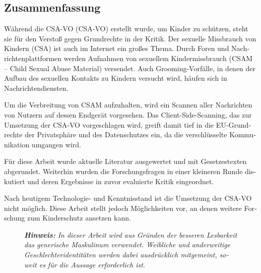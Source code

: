 \begin{otherlanguage}{ngerman}
	\chapter*{Zusammenfassung}
    
Während die \acl{CSA-VO} (\acs{CSA-VO}) erstellt wurde, um Kinder zu schützen, steht sie für den Verstoß gegen Grundrechte in der Kritik. Der sexuelle Missbrauch von Kindern (\acf{CSA}) ist auch im Internet ein großes Thema. Durch Foren und Nachrichtenplattformen werden Aufnahmen von sexuellem Kindermissbrauch (\acs{CSAM} – Child Sexual Abuse Material) versendet. Auch Grooming-Vorfälle, in denen der Aufbau des sexuellen Kontakts zu Kindern versucht wird, häufen sich in Nachrichtendiensten.

Um die Verbreitung von \acs{CSAM} aufzuhalten, wird ein Scannen aller Nachrichten von Nutzern auf dessen Endgerät vorgesehen. Das Client-Side-Scan\-ning, das zur Umsetzung der \acs{CSA-VO} vorgeschlagen wird, greift damit tief in die \acs{EU}-Grundrechte der Privatsphäre und des Datenschutzes ein, da die verschlüsselte Kommunikation umgangen wird.


Für diese Arbeit wurde aktuelle Literatur ausgewertet und mit Gesetzestexten abgerundet. Weiterhin wurden die Forschungsfragen in einer kleineren Runde diskutiert und deren Ergebnisse in zuvor evaluierte Kritik eingeordnet.

Nach heutigem Technologie- und Kenntnisstand ist die Umsetzung der \acs{CSA-VO} nicht möglich. Diese Arbeit stellt jedoch Möglichkeiten vor, an denen weitere Forschung zum Kinderschutz ansetzen kann.

\begin{figure}[b]
    \noindent
    \textit{\textbf{Hinweis:} In dieser Arbeit wird aus Gründen der besseren Lesbarkeit das generische Maskulinum verwendet. Weibliche und anderweitige Geschlechteridentitäten werden dabei ausdrücklich mitgemeint, soweit es für die Aussage erforderlich ist.}
\end{figure}



\end{otherlanguage}
